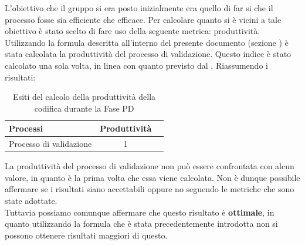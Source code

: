 				L'obiettivo che il gruppo si era posto inizialmente era quello di far si che il processo fosse sia efficiente che efficace. Per calcolare quanto si è vicini a tale obiettivo è stato scelto di fare uso della seguente metrica: produttività.\\
				Utilizzando la formula descritta all'interno del presente documento (sezione ) è stata calcolata la produttività del processo di validazione. Questo indice è stato calcolato una sola volta, in linea con quanto previsto dal . Riassumendo i risultati:
				\begin{table}[H]
			    	\centering
					\begin{tabu}{| l | c | c |}
						\hline
							Processi 				  & Produttività   \\ \hline \hline
							Processo di validazione   & 1              \\ \hline
					\end{tabu}
					\caption{Esiti del calcolo della produttività della codifica durante la Fase PD}
				\end{table}
				La produttività del processo di validazione non può essere confrontata con alcun valore, in quanto è la prima volta che essa viene calcolata. Non è dunque possibile affermare se i risultati siano accettabili oppure no seguendo le metriche che sono state adottate.\\
				Tuttavia possiamo comunque affermare che questo risultato è \textbf{ottimale}, in quanto utilizzando la formula che è stata precedentemente introdotta non si possono ottenere risultati maggiori di questo.